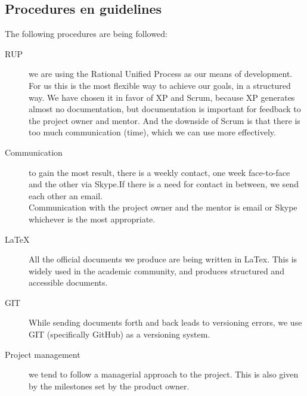 \documentclass{article}
\begin{document}
\begin{itemize}
\subsection{Procedures en guidelines}
The following procedures are being followed:
\begin{description}
  \item[RUP] we are using the Rational Unified Process as our means of development. For us this is the most flexible way to achieve our goals, in a structured way. We have chosen it in favor of XP and Scrum, because XP generates almost no documentation, but documentation is important for feedback to the project owner and mentor. And the downside of Scrum is that there is too much communication (time), which we can use more effectively.
  \item[Communication] to gain the most result, there is a weekly contact, one week face-to-face and the other via Skype.If there is a need for contact in between, we send each other an email.\\
Communication with the project owner and the mentor is email or Skype whichever is the most appropriate.
  \item[LaTeX] All the official documents we produce are being written in LaTex. This is widely used in the academic community, and produces structured and accessible documents.
  \item[GIT] While sending documents forth and back leads to versioning errors, we use GIT (specifically GitHub) as a versioning system.
  \item[Project management] we tend to follow a managerial approach to the project. This is also given by the milestones set by the product owner.
\end{description}


\end{itemize}
\end{document}
